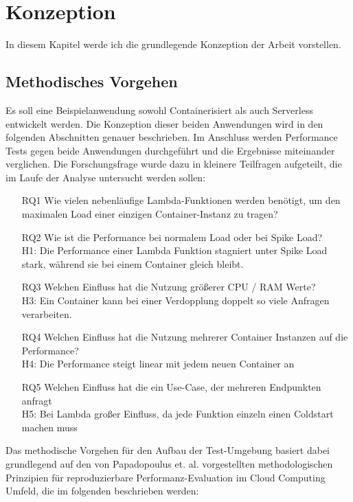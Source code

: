 \chapter{Konzeption}
In diesem Kapitel werde ich die grundlegende Konzeption der Arbeit vorstellen.

\section{Methodisches Vorgehen}
Es soll eine Beispielanwendung sowohl Containerisiert als auch Serverless entwickelt werden. Die Konzeption dieser beiden Anwendungen wird in den folgenden Abschnitten genauer beschrieben. 
Im Anschluss werden Performance Tests gegen beide Anwendungen durchgeführt und die Ergebnisse miteinander verglichen. Die Forschungsfrage wurde dazu in kleinere Teilfragen aufgeteilt, die im Laufe der Analyse untersucht werden sollen:

\begin{enumerate}
    \item[RQ1] Wie vielen nebenläufige Lambda-Funktionen werden benötigt, um den maximalen Load einer einzigen Container-Instanz zu tragen?
    
    \item[RQ2] Wie ist die Performance bei normalem Load oder bei Spike Load? \\
    H1: Die Performance einer Lambda Funktion stagniert unter Spike Load stark, während sie bei einem Container gleich bleibt.

    \item[RQ3] Welchen Einfluss hat die Nutzung größerer CPU / RAM Werte? \\
    H3: Ein Container kann bei einer Verdopplung doppelt so viele Anfragen verarbeiten.
    
    \item[RQ4] Welchen Einfluss hat die Nutzung mehrerer Container Instanzen auf die Performance? \\
    H4: Die Performance steigt linear mit jedem neuen Container an
    
    \item[RQ5] Welchen Einfluss hat die ein Use-Case, der mehreren Endpunkten anfragt\\
    H5: Bei Lambda großer Einfluss, da jede Funktion einzeln einen Coldstart machen muss
\end{enumerate}

Das methodische Vorgehen für den Aufbau der Test-Umgebung basiert dabei grundlegend auf den von Papadopoulus et. al. vorgestellten methodologischen Prinzipien für reproduzierbare Performanz-Evaluation im Cloud Computing Umfeld, die im folgenden beschrieben werden\cite{papadopoulos_methodological_2019}:

